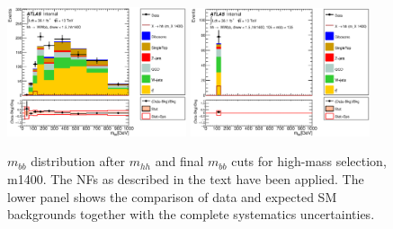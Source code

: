 \begin{figure}
\begin{center}
\includegraphics*[width=0.47\textwidth] {figures/Unblinded_mbb/C_reOpt2000_bbpt350_wwpt250_drww15_hh1400_bbMass_regionA_met25d020.eps}
\includegraphics*[width=0.47\textwidth] {figures/Unblinded_mbb/C_reOpt2000_bbpt350_wwpt250_drww15_hh1400_mbb_bbMass_regionA_met25d020.eps}
\caption[$m_{bb}$ distribution after $m_{hh}$ and final $m_{bb}$ cuts for high-mass selection, m1400.]{$m_{bb}$ distribution after $m_{hh}$ and final $m_{bb}$ cuts for high-mass selection, m1400. The NFs as described in the text have been applied. The lower panel shows the comparison of data and expected SM backgrounds together with the complete systematics uncertainties.}
\end{center}
\end{figure}

